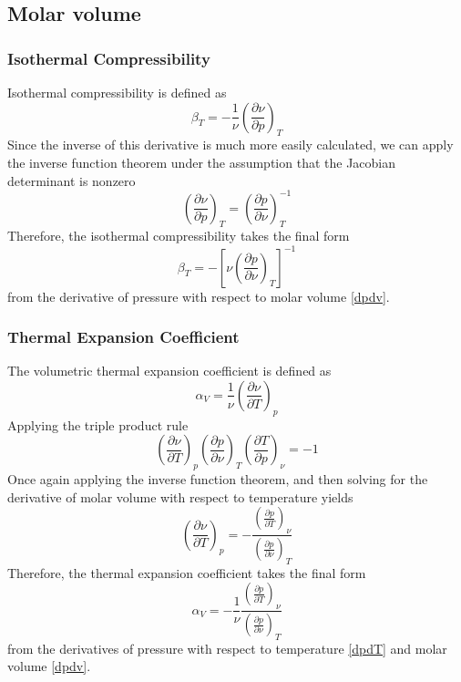 \documentclass{article}
\newcommand{\pderiv}[2]{\frac{\partial #1}{\partial #2}}
\newcommand{\pderivconst}[3]{\left(\pderiv{#1}{#2}\right)_{#3}}
\begin{document}
\subsection{Molar volume}
\subsubsection{Isothermal Compressibility}
Isothermal compressibility is defined as 
\begin{equation}
    \beta_T = -\frac{1}{\nu} \pderivconst{\nu}{p}{T}
\end{equation}
Since the inverse of this derivative is much more easily calculated, we can apply the inverse function theorem under the assumption that the Jacobian determinant is nonzero
\begin{equation*}
    \pderivconst{\nu}{p}{T} = \pderivconst{p}{\nu}{T}^{-1}
\end{equation*}
Therefore, the isothermal compressibility takes the final form
\begin{equation}
    \beta_T = -\left[\nu \pderivconst{p}{\nu}{T}\right]^{-1} \label{betaT}
\end{equation}
from the derivative of pressure with respect to molar volume \eqref{dpdv}.


\subsubsection{Thermal Expansion Coefficient}
The volumetric thermal expansion coefficient is defined as
\begin{equation}
    \alpha_V = \frac{1}{\nu} \pderivconst{\nu}{T}{p}
\end{equation}
Applying the triple product rule
\begin{equation*}
    \pderivconst{\nu}{T}{p} \pderivconst{p}{\nu}{T} \pderivconst{T}{p}{\nu} = -1 
\end{equation*}
Once again applying the inverse function theorem, and then solving for the derivative of molar volume with respect to temperature yields
\begin{equation*}
    \pderivconst{\nu}{T}{p} = -\frac{\pderivconst{p}{T}{\nu}}{\pderivconst{p}{\nu}{T}}
\end{equation*}
Therefore, the thermal expansion coefficient takes the final form
\begin{equation}
    \alpha_V = -\frac{1}{\nu} \frac{\pderivconst{p}{T}{\nu}}{\pderivconst{p}{\nu}{T}} \label{alphaV}
\end{equation}
from the derivatives of pressure with respect to temperature \eqref{dpdT} and molar volume \eqref{dpdv}. 
\end{document}
